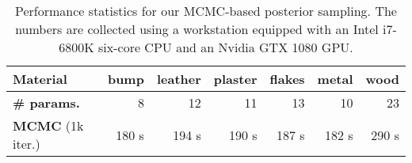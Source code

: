 \begin{table}[t]
	\centering
	\caption{\label{fig:performance}
		Performance statistics for our MCMC-based posterior sampling.
		The numbers are collected using a workstation equipped with an Intel i7-6800K six-core CPU and an Nvidia GTX 1080 GPU.  %
	}
	\addtolength{\tabcolsep}{-3pt}
	\begin{tabular}{l|rrrrrr}
		\textbf{Material} & bump & leather & plaster & flakes & metal & wood\\
		\hline
		\textbf{\# params.} & 8 & 12 & 11 & 13 & 10 & 23\\
		\textbf{MCMC} (1k iter.) & 180 s & 194 s & 190 s & 187 s & 182 s & 290 s
	\end{tabular}
\end{table}

